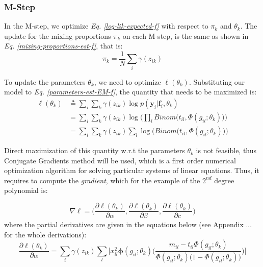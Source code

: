 \subsubsection{M-Step}
In the M-step, we optimize \emph{Eq. \ref{log-lik-expected-f}} with respect to $\pi_{k}$ and $\theta_{k}$. The update for the mixing proportions $\pi_{k}$ on each M-step, is the same as shown in \emph{Eq. \ref{mixing-proportions-est-f}}, that is:
\begin{equation} \label{mixing-proportions-est2-f}
		\pi_{k} = \frac{1}{N} \sum_{i} \gamma(z_{ik})
\end{equation}

To update the parameters $\theta_{k}$, we need to optimize $\ell(\theta_{k})$. Substituting our model to \emph{Eq. \ref{parameters-est-EM-f}}, the quantity that needs to be maximized is:
\begin{equation} \label{parameters-est2-EM-f}
  \begin{split}
	\ell(\theta_{k}) & \triangleq \sum_{i} \sum_{k} \gamma(z_{ik}) \log p(\mathbf{y}_{i}|\mathbf{f}_{i}, \theta_{k}) \\
					 & = \sum_{i} \sum_{k} \gamma(z_{ik}) \log \bigg( \prod_{l} Binom \big(t_{il}, \Phi(g_{il}; \theta_{k})\big) \bigg)\\
					 & = \sum_{i} \sum_{k} \gamma(z_{ik}) \sum_{l} \log \bigg(Binom \big(t_{il}, \Phi(g_{il}; \theta_{k})\big) \bigg)
  \end{split}
\end{equation}

Direct maximization of this quantity w.r.t the parameters $\theta_{k}$ is not feasible, thus Conjugate Gradients method \citep{Hestenes1952} will be used, which is a first order numerical optimization algorithm for solving particular systems of linear equations. Thus, it requires to compute the \emph{gradient}, which for the example of the $2^{nd}$ degree polynomial is:

\begin{equation} \label{gradient-f}
	\nabla\ell = \bigg( \frac{\partial \ell(\theta_{k})}{\partial \alpha}, \frac{\partial \ell(\theta_{k})}{\partial \beta}, \frac{\partial \ell(\theta_{k})}{\partial c}\bigg) 
\end{equation}
where the partial derivatives are given in the equations below (see Appendix ... for the whole derivations):
\begin{equation} \label{derivative-a-f}
	\frac{\partial \ell(\theta_{k})}{\partial \alpha} =  \sum_{i}  \gamma(z_{ik}) \sum_{l} \bigg[ x_{il}^{2} \mathbf{\phi}(g_{il};\theta_{k})\bigg(\frac{m_{il} - t_{il}\Phi(g_{il};\theta_{k})}{\Phi(g_{il};\theta_{k})\big(1-\Phi(g_{il};\theta_{k})\big)} \bigg) \bigg]
\end{equation}

